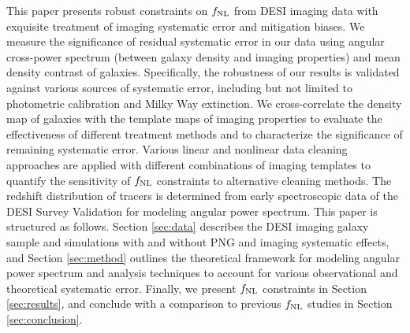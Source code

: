 This paper presents robust constraints on $f_{\rm NL}$ from DESI imaging data with exquisite treatment of imaging systematic error and mitigation biases. We measure the significance of residual systematic error in our data using angular cross-power spectrum (between galaxy density and imaging properties) and mean density contrast of galaxies. Specifically, the robustness of our results is validated against various sources of systematic error, including but not limited to photometric calibration and Milky Way extinction. We cross-correlate the density map of galaxies with the template maps of imaging properties to evaluate the effectiveness of different treatment methods and to characterize the significance of remaining systematic error. Various linear and nonlinear data cleaning approaches are applied with different combinations of imaging templates to quantify the sensitivity of $f_{\rm NL}$ constraints to alternative cleaning methods. The redshift distribution of tracers is determined from early spectroscopic data of the DESI Survey Validation for modeling angular power spectrum. This paper is structured as follows. Section \ref{sec:data} describes the DESI imaging galaxy sample and simulations with and without PNG and imaging systematic effects, and Section \ref{sec:method} outlines the theoretical framework for modeling angular power spectrum and analysis techniques to account for various observational and theoretical systematic error. Finally, we present $f_{\rm NL}$ constraints in Section \ref{sec:results}, and conclude with a comparison to previous $f_{\rm NL}$ studies in Section \ref{sec:conclusion}.